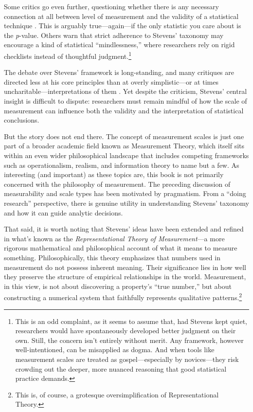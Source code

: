 Some critics go even further, questioning whether there is any necessary connection at all between level of measurement and the validity of a statistical technique \parencite{Gaito1980}. This is arguably true—again—if the only statistic you care about is the \textit{p}-value. Others warn that strict adherence to Stevens’ taxonomy may encourage a kind of statistical ``mindlessness,'' where researchers rely on rigid checklists instead of thoughtful judgment.\footnote{This is an odd complaint, as it seems to assume that, had Stevens kept quiet, researchers would have spontaneously developed better judgment on their own. Still, the concern isn’t entirely without merit. Any framework, however well-intentioned, can be misapplied as dogma. And when tools like measurement scales are treated as gospel—especially by novices—they risk crowding out the deeper, more nuanced reasoning that good statistical practice demands.}

The debate over Stevens’ framework is long-standing, and many critiques are directed less at his core principles than at overly simplistic—or at times uncharitable—interpretations of them \parencite[see][for a summary]{ZandScholten2009}. Yet despite the criticism, Stevens’ central insight is difficult to dispute: researchers must remain mindful of how the scale of measurement can influence both the validity and the interpretation of statistical conclusions.

But the story does not end there. The concept of measurement scales is just one part of a broader academic field known as Measurement Theory, which itself sits within an even wider philosophical landscape that includes competing frameworks such as operationalism, realism, and information theory to name but a few. As interesting (and important) as these topics are, this book is not primarily concerned with the philosophy of measurement. The preceding discussion of measurability and scale types has been motivated by pragmatism. From a “doing research” perspective, there is genuine utility in understanding Stevens’ taxonomy and how it can guide analytic decisions.

That said, it is worth noting that Stevens’ ideas have been extended and refined in what’s known as the \textit{Representational Theory of Measurement}—a more rigorous mathematical and philosophical account of what it means to measure something. Philosophically, this theory emphasizes that numbers used in measurement do not possess inherent meaning. Their significance lies in how well they preserve the structure of empirical relationships in the world. Measurement, in this view, is not about discovering a property's ``true number,'' but about constructing a numerical system that faithfully represents qualitative patterns.\footnote{This is, of course, a grotesque oversimplification of Representational Theory.}

